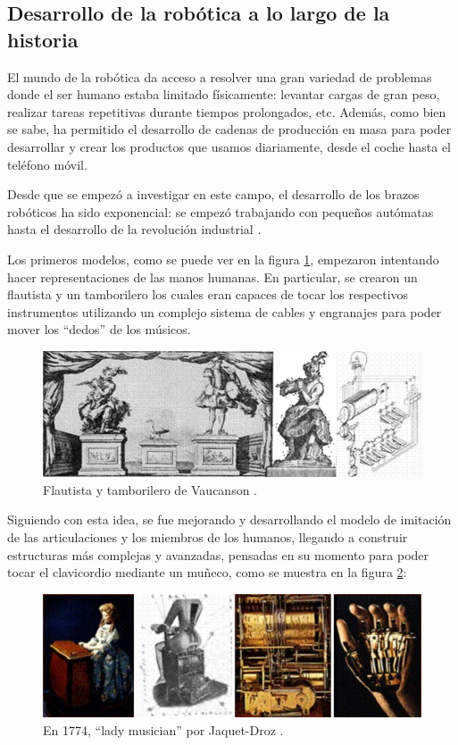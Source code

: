 \subsection{Desarrollo de la robótica a lo largo de la historia}

El mundo de la robótica da acceso a resolver una gran variedad de problemas donde el ser humano estaba
limitado físicamente: levantar cargas de gran peso, realizar tareas repetitivas durante tiempos
prolongados, etc. Además, como bien se sabe, ha permitido el desarrollo de cadenas de producción en
masa para poder desarrollar y crear los productos que usamos diariamente, desde el coche hasta el 
teléfono móvil.

Desde que se empezó a investigar en este campo, el desarrollo de los brazos robóticos ha sido 
exponencial: se empezó trabajando con pequeños autómatas hasta el desarrollo de la revolución
industrial \cite{moranEvolutionRoboticArms2007a}.

Los primeros modelos, como se puede ver en la figura \ref{fig:evolution}, empezaron intentando hacer
representaciones de las manos humanas. En particular, se crearon un flautista y un tamborilero los
cuales eran capaces de tocar los respectivos instrumentos utilizando un complejo sistema de cables y 
engranajes para poder mover los ``dedos'' de los músicos.

\begin{figure}[H]
    \centering
    \includegraphics[width=.75\linewidth]{pictures/evolution_of_robotic_arms.png}
    \caption{Flautista y tamborilero de Vaucanson \cite{vaucansonMecanismeFluteurAutomate1738a}.}
    \label{fig:evolution}
\end{figure}

Siguiendo con esta idea, se fue mejorando y desarrollando el modelo de imitación de las articulaciones
y los miembros de los humanos, llegando a construir estructuras más complejas y avanzadas, pensadas en 
su momento para poder tocar el clavicordio mediante un muñeco, como se muestra en la figura 
\ref{fig:lady_musician}:

\begin{figure}[H]
    \centering
    \includegraphics[width=.8\linewidth]{pictures/reproduction_of_lady_musician.png}
    \caption{En 1774, ``lady musician'' por Jaquet-Droz \cite{chapuisalfredanddrozedmondAutomataHistoricalTechnological1958a}.}
    \label{fig:lady_musician}
\end{figure}

